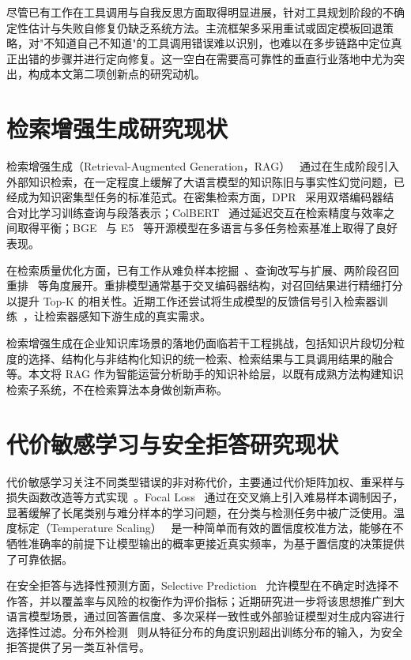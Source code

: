 尽管已有工作在工具调用与自我反思方面取得明显进展，针对工具规划阶段的不确定性估计与失败自修复仍缺乏系统方法。主流框架多采用重试或固定模板回退策略，对"不知道自己不知道"的工具调用错误难以识别，也难以在多步链路中定位真正出错的步骤并进行定向修复。这一空白在需要高可靠性的垂直行业落地中尤为突出，构成本文第二项创新点的研究动机。

\section{检索增强生成研究现状}

检索增强生成（Retrieval-Augmented Generation，RAG）~\cite{rag} 通过在生成阶段引入外部知识检索，在一定程度上缓解了大语言模型的知识陈旧与事实性幻觉问题，已经成为知识密集型任务的标准范式。在密集检索方面，DPR~\cite{dpr} 采用双塔编码器结合对比学习训练查询与段落表示；ColBERT~\cite{colbert} 通过延迟交互在检索精度与效率之间取得平衡；BGE~\cite{bge} 与 E5~\cite{e5} 等开源模型在多语言与多任务检索基准上取得了良好表现。

在检索质量优化方面，已有工作从难负样本挖掘~\cite{hardneg}、查询改写与扩展、两阶段召回重排~\cite{rerank} 等角度展开。重排模型通常基于交叉编码器结构，对召回结果进行精细打分以提升 Top-K 的相关性。近期工作还尝试将生成模型的反馈信号引入检索器训练~\cite{repllama}，让检索器感知下游生成的真实需求。

检索增强生成在企业知识库场景的落地仍面临若干工程挑战，包括知识片段切分粒度的选择、结构化与非结构化知识的统一检索、检索结果与工具调用结果的融合等。本文将 RAG 作为智能运营分析助手的知识补给层，以既有成熟方法构建知识检索子系统，不在检索算法本身做创新声称。

\section{代价敏感学习与安全拒答研究现状}

代价敏感学习关注不同类型错误的非对称代价，主要通过代价矩阵加权、重采样与损失函数改造等方式实现~\cite{costsensitive}。Focal Loss~\cite{focalloss} 通过在交叉熵上引入难易样本调制因子，显著缓解了长尾类别与难分样本的学习问题，在分类与检测任务中被广泛使用。温度标定（Temperature Scaling）~\cite{tempscaling} 是一种简单而有效的置信度校准方法，能够在不牺牲准确率的前提下让模型输出的概率更接近真实频率，为基于置信度的决策提供了可靠依据。

在安全拒答与选择性预测方面，Selective Prediction~\cite{selectiveprediction} 允许模型在不确定时选择不作答，并以覆盖率与风险的权衡作为评价指标；近期研究进一步将该思想推广到大语言模型场景，通过回答置信度、多次采样一致性或外部验证模型对生成内容进行选择性过滤。分布外检测~\cite{ood} 则从特征分布的角度识别超出训练分布的输入，为安全拒答提供了另一类互补信号。


